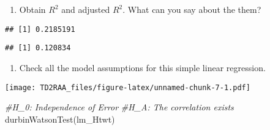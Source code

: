 \documentclass[
]{article}
\newenvironment{Shaded}{\begin{snugshade}}{\end{snugshade}}
\newcommand{\AttributeTok}[1]{\textcolor[rgb]{0.77,0.63,0.00}{#1}}
\newcommand{\CommentTok}[1]{\textcolor[rgb]{0.56,0.35,0.01}{\textit{#1}}}
\newcommand{\DecValTok}[1]{\textcolor[rgb]{0.00,0.00,0.81}{#1}}
\newcommand{\FunctionTok}[1]{\textcolor[rgb]{0.00,0.00,0.00}{#1}}
\newcommand{\NormalTok}[1]{#1}
\newcommand{\OtherTok}[1]{\textcolor[rgb]{0.56,0.35,0.01}{#1}}
\newcommand{\SpecialCharTok}[1]{\textcolor[rgb]{0.00,0.00,0.00}{#1}}
\providecommand{\tightlist}{%
  \setlength{\itemsep}{0pt}\setlength{\parskip}{0pt}}
\begin{document}
\begin{enumerate}
\def\labelenumi{\alph{enumi}.}
\setcounter{enumi}{3}
\tightlist
\item
  Obtain \(R^2\) and adjusted \(R^2\). What can you say about the them?
\end{enumerate}

\begin{Shaded}
\end{Shaded}

\begin{verbatim}
## [1] 0.2185191
\end{verbatim}

\begin{Shaded}
\end{Shaded}

\begin{verbatim}
## [1] 0.120834
\end{verbatim}

\begin{enumerate}
\def\labelenumi{\alph{enumi}.}
\setcounter{enumi}{4}
\tightlist
\item
  Check all the model assumptions for this simple linear regression.
\end{enumerate}

\begin{Shaded}
\end{Shaded}

\texttt{[image: TD2RAA\_files/figure-latex/unnamed-chunk-7-1.pdf]}

\begin{Shaded}
\begin{Highlighting}[]
\CommentTok{\#H\_0: Independence of Error}
\CommentTok{\#H\_A: The correlation exists}
\FunctionTok{durbinWatsonTest}\NormalTok{(lm\_Htwt)}
\end{Highlighting}
\end{Shaded}
\end{document}
